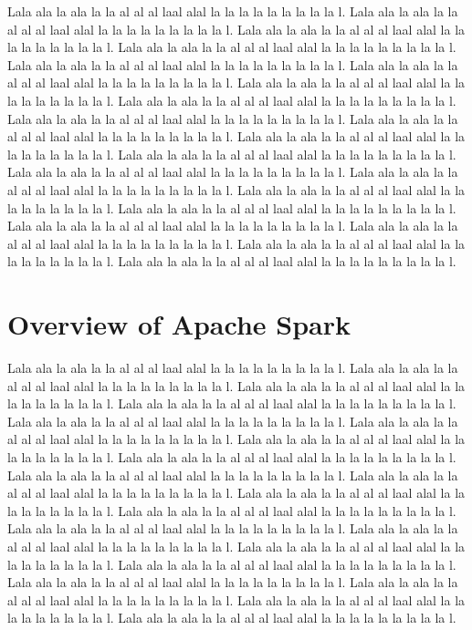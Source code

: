 \documentclass{article}
\begin{document}
Lala ala la ala la la al al al laal alal la la la la la la la la la l. Lala ala la ala la la al al al laal alal la la la la la la la la la l. Lala ala la ala la la al al al laal alal la la la la la la la la la l. Lala ala la ala la la al al al laal alal la la la la la la la la la l. Lala ala la ala la la al al al laal alal la la la la la la la la la l. Lala ala la ala la la al al al laal alal la la la la la la la la la l. Lala ala la ala la la al al al laal alal la la la la la la la la la l. Lala ala la ala la la al al al laal alal la la la la la la la la la l. Lala ala la ala la la al al al laal alal la la la la la la la la la l. Lala ala la ala la la al al al laal alal la la la la la la la la la l. Lala ala la ala la la al al al laal alal la la la la la la la la la l. Lala ala la ala la la al al al laal alal la la la la la la la la la l. Lala ala la ala la la al al al laal alal la la la la la la la la la l. Lala ala la ala la la al al al laal alal la la la la la la la la la l. Lala ala la ala la la al al al laal alal la la la la la la la la la l. Lala ala la ala la la al al al laal alal la la la la la la la la la l. Lala ala la ala la la al al al laal alal la la la la la la la la la l. Lala ala la ala la la al al al laal alal la la la la la la la la la l. Lala ala la ala la la al al al laal alal la la la la la la la la la l. Lala ala la ala la la al al al laal alal la la la la la la la la la l. 


\section{Overview of Apache Spark}

Lala ala la ala la la al al al laal alal la la la la la la la la la l. Lala ala la ala la la al al al laal alal la la la la la la la la la l. Lala ala la ala la la al al al laal alal la la la la la la la la la l. Lala ala la ala la la al al al laal alal la la la la la la la la la l. Lala ala la ala la la al al al laal alal la la la la la la la la la l. Lala ala la ala la la al al al laal alal la la la la la la la la la l. Lala ala la ala la la al al al laal alal la la la la la la la la la l. Lala ala la ala la la al al al laal alal la la la la la la la la la l. Lala ala la ala la la al al al laal alal la la la la la la la la la l. Lala ala la ala la la al al al laal alal la la la la la la la la la l. Lala ala la ala la la al al al laal alal la la la la la la la la la l. Lala ala la ala la la al al al laal alal la la la la la la la la la l. Lala ala la ala la la al al al laal alal la la la la la la la la la l. Lala ala la ala la la al al al laal alal la la la la la la la la la l. Lala ala la ala la la al al al laal alal la la la la la la la la la l. Lala ala la ala la la al al al laal alal la la la la la la la la la l. Lala ala la ala la la al al al laal alal la la la la la la la la la l. Lala ala la ala la la al al al laal alal la la la la la la la la la l. Lala ala la ala la la al al al laal alal la la la la la la la la la l. Lala ala la ala la la al al al laal alal la la la la la la la la la l. 
\end{document}

